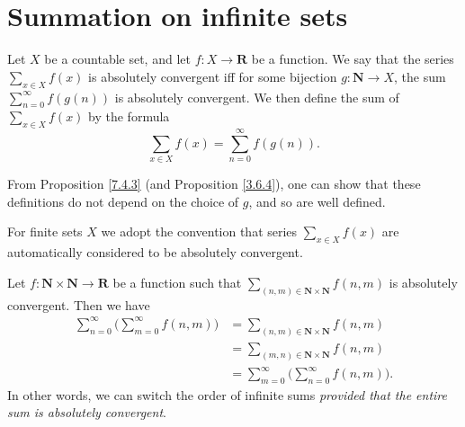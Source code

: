 \section{Summation on infinite sets}\label{sec 8.2}

\begin{definition}\label{8.2.1}
    Let \(X\) be a countable set, and let \(f : X \to \mathbf{R}\) be a function.
    We say that the series \(\sum_{x \in X} f(x)\) is absolutely convergent iff for some bijection \(g : \mathbf{N} \to X\), the sum \(\sum_{n = 0}^\infty f(g(n))\) is absolutely convergent.
    We then define the sum of \(\sum_{x \in X} f(x)\) by the formula
    \[
        \sum_{x \in X} f(x) = \sum_{n = 0}^\infty f(g(n)).
    \]
\end{definition}

\begin{note}
    From Proposition \ref{7.4.3} (and Proposition \ref{3.6.4}), one can show that these definitions do not depend on the choice of \(g\), and so are well defined.
\end{note}

\begin{note}
    For finite sets \(X\) we adopt the convention that series \(\sum_{x \in X} f(x)\) are automatically considered to be absolutely convergent.
\end{note}

\begin{theorem}\label{8.2.2}
    Let \(f : \mathbf{N} \times \mathbf{N} \to \mathbf{R}\) be a function such that \(\sum_{(n, m) \in \mathbf{N} \times \mathbf{N}} f(n, m)\) is absolutely convergent.
    Then we have
    \begin{align*}
        \sum_{n = 0}^\infty \bigg(\sum_{m = 0}^\infty f(n, m)\bigg) & = \sum_{(n, m) \in \mathbf{N} \times \mathbf{N}} f(n, m)       \\
                                                                    & = \sum_{(m, n) \in \mathbf{N} \times \mathbf{N}} f(n, m)       \\
                                                                    & = \sum_{m = 0}^\infty \bigg(\sum_{n = 0}^\infty f(n, m)\bigg).
    \end{align*}
    In other words, we can switch the order of infinite sums \emph{provided that the entire sum is absolutely convergent}.
\end{theorem}

